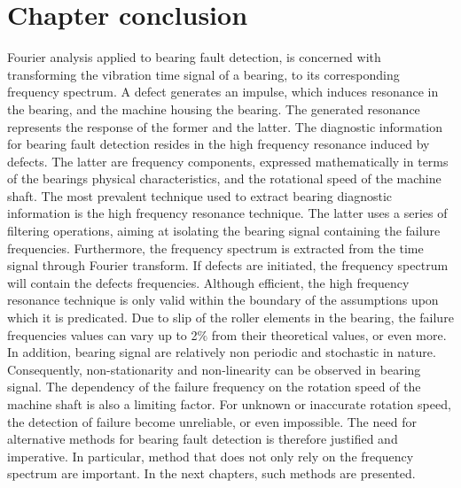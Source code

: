 \documentclass[../Main/thesis.tex]{subfiles}
\begin{document}
\section{Chapter conclusion}
\label{sec:chapter_conclusion}
Fourier analysis applied to bearing fault detection, is concerned with transforming the vibration time signal of a bearing, to its corresponding frequency spectrum. A defect generates an impulse, which induces resonance in the bearing, and the machine housing the bearing. The generated resonance represents the response of the former and the latter.
\justify
The diagnostic information for bearing fault detection resides in the high frequency resonance induced by defects. The latter are frequency components, expressed mathematically in terms of the bearings physical characteristics, and the rotational speed of the machine shaft. The most prevalent technique used to extract bearing diagnostic information is the high frequency resonance technique.
\justify
The latter uses a series of filtering operations, aiming at isolating the bearing signal containing the failure frequencies. Furthermore, the frequency spectrum is extracted from the time signal through Fourier transform. If defects are initiated, the frequency spectrum will contain the defects frequencies. Although efficient, the high frequency resonance technique is only valid within the boundary of the assumptions upon which it is predicated. 
\justify
Due to slip of the roller elements in the bearing, the failure frequencies values can vary up to 2$\%$ from their theoretical values, or even more. In addition, bearing signal are relatively non periodic and stochastic in nature. Consequently, non-stationarity and non-linearity can be observed in bearing signal. The dependency of the failure frequency on the rotation speed of the machine shaft is also a limiting factor. For unknown or inaccurate rotation speed, the detection of failure become unreliable, or even impossible. The need for alternative methods for bearing fault detection is therefore justified and imperative. In particular, method that does not only rely on the frequency spectrum are important. In the next chapters, such methods are presented.



















\blankpage
\end{document}

